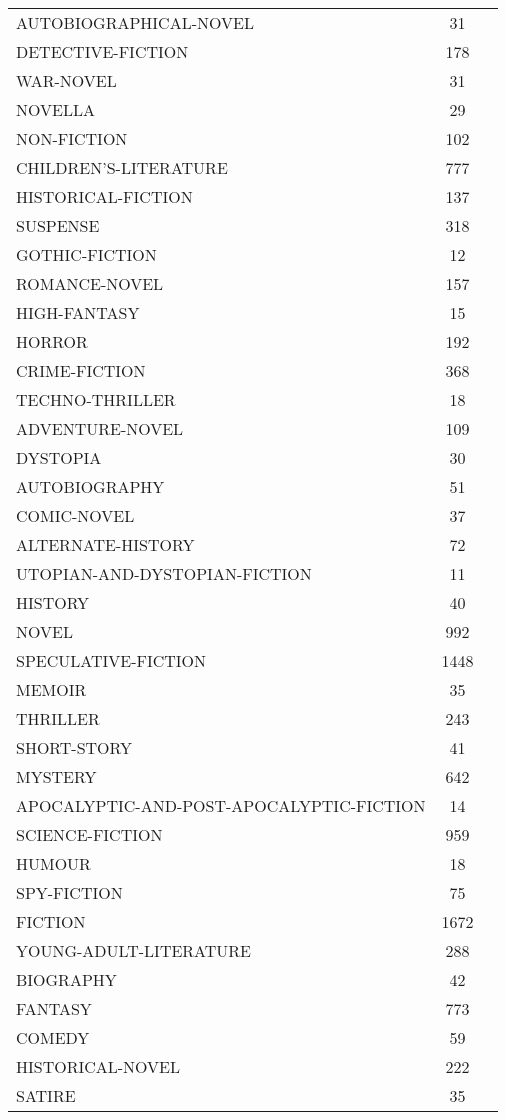 \documentclass[fleqn,a4paper,12pt]{article}
\begin{document}
\begin{tabular}{| l | c | r |}
  AUTOBIOGRAPHICAL-NOVEL & 31 \\
  DETECTIVE-FICTION & 178 \\
  WAR-NOVEL & 31 \\
  NOVELLA & 29 \\
  NON-FICTION & 102 \\
  CHILDREN'S-LITERATURE & 777 \\
  HISTORICAL-FICTION & 137 \\
  SUSPENSE & 318 \\
  GOTHIC-FICTION & 12 \\
  ROMANCE-NOVEL & 157 \\
  HIGH-FANTASY & 15 \\
  HORROR & 192 \\
  CRIME-FICTION & 368 \\
  TECHNO-THRILLER & 18 \\
  ADVENTURE-NOVEL & 109 \\
  DYSTOPIA & 30 \\
  AUTOBIOGRAPHY & 51 \\
  COMIC-NOVEL & 37 \\
  ALTERNATE-HISTORY & 72 \\
  UTOPIAN-AND-DYSTOPIAN-FICTION & 11 \\
  HISTORY & 40 \\
  NOVEL & 992 \\
  SPECULATIVE-FICTION & 1448 \\
  MEMOIR & 35 \\
  THRILLER & 243 \\
  SHORT-STORY & 41 \\
  MYSTERY & 642 \\
  APOCALYPTIC-AND-POST-APOCALYPTIC-FICTION & 14 \\
  SCIENCE-FICTION & 959 \\
  HUMOUR & 18 \\
  SPY-FICTION & 75 \\
  FICTION & 1672 \\
  YOUNG-ADULT-LITERATURE & 288 \\
  BIOGRAPHY & 42 \\
  FANTASY & 773 \\
  COMEDY & 59 \\
  HISTORICAL-NOVEL & 222 \\
  SATIRE & 35 \\
\end{tabular}
\end{document}
